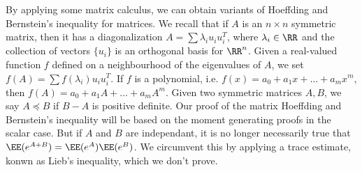 %
%
%
%

%
%
%
%


By applying some matrix calculus, we can obtain variants of Hoeffding and Bernstein's inequality for matrices. We recall that if $A$ is an $n \times n$ symmetric matrix, then it has a diagonalization $A = \sum \lambda_i u_i u_i^T$, where $\lambda_i \in \RR$ and the collection of vectors $\{ u_i \}$ is an orthogonal basis for $\RR^n$. Given a real-valued function $f$ defined on a neighbourhood of the eigenvalues of $A$, we set $f(A) = \sum f(\lambda_i) u_i u_i^T$. If $f$ is a polynomial, i.e. $f(x) = a_0 + a_1x + \dots + a_m x^m$, then $f(A) = a_0 + a_1A + \dots + a_m A^m$. Given two symmetric matrices $A,B$, we say $A \preceq B$ if $B - A$ is positive definite. Our proof of the matrix Hoeffding and Bernstein's inequality will be based on the moment generating proofs in the scalar case. But if $A$ and $B$ are independant, it is no longer necessarily true that $\EE(e^{A+B}) = \EE(e^A) \EE(e^B)$. We circumvent this by applying a trace estimate, konwn as Lieb's inequality, which we don't prove.


